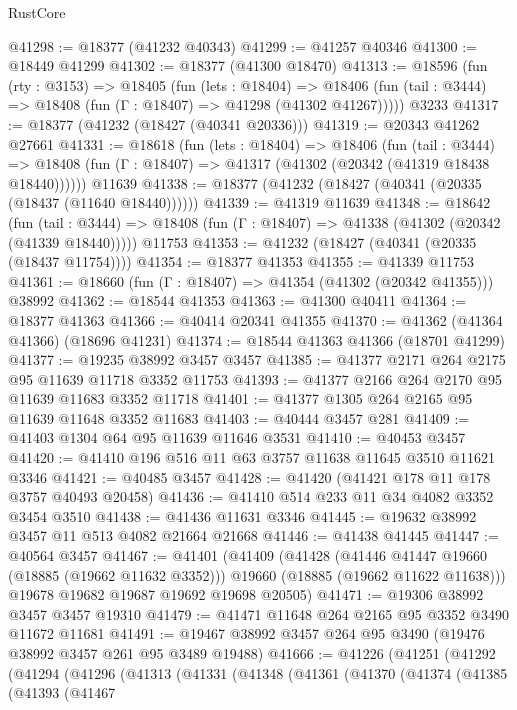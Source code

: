 \begin{lexlean}{RustCore}
\begin{coremodule}
@41298 := @18377 (@41232 @40343)
@41299 := @41257 @40346
@41300 := @18449 @41299
@41302 := @18377 (@41300 @18470)
@41313 := @18596
    (fun (rty : @3153) =>
    @18405
      (fun (lets : @18404) =>
      @18406 (fun (tail : @3444) => @18408 (fun (Γ : @18407) => @41298 (@41302 @41267)))))
    @3233
@41317 := @18377 (@41232 (@18427 (@40341 @20336)))
@41319 := @20343 @41262 @27661
@41331 := @18618
    (fun (lets : @18404) =>
    @18406
      (fun (tail : @3444) =>
      @18408 (fun (Γ : @18407) => @41317 (@41302 (@20342 (@41319 @18438 @18440))))))
    @11639
@41338 := @18377 (@41232 (@18427 (@40341 (@20335 (@18437 (@11640 @18440))))))
@41339 := @41319 @11639
@41348 := @18642
    (fun (tail : @3444) => @18408 (fun (Γ : @18407) => @41338 (@41302 (@20342 (@41339 @18440)))))
    @11753
@41353 := @41232 (@18427 (@40341 (@20335 (@18437 @11754))))
@41354 := @18377 @41353
@41355 := @41339 @11753
@41361 := @18660 (fun (Γ : @18407) => @41354 (@41302 (@20342 @41355))) @38992
@41362 := @18544 @41353
@41363 := @41300 @40411
@41364 := @18377 @41363
@41366 := @40414 @20341 @41355
@41370 := @41362 (@41364 @41366) (@18696 @41231)
@41374 := @18544 @41363 @41366 (@18701 @41299)
@41377 := @19235 @38992 @3457 @3457
@41385 := @41377 @2171 @264 @2175 @95 @11639 @11718 @3352 @11753
@41393 := @41377 @2166 @264 @2170 @95 @11639 @11683 @3352 @11718
@41401 := @41377 @1305 @264 @2165 @95 @11639 @11648 @3352 @11683
@41403 := @40444 @3457 @281
@41409 := @41403 @1304 @64 @95 @11639 @11646 @3531
@41410 := @40453 @3457
@41420 := @41410 @196 @516 @11 @63 @3757 @11638 @11645 @3510 @11621 @3346
@41421 := @40485 @3457
@41428 := @41420 (@41421 @178 @11 @178 @3757 @40493 @20458)
@41436 := @41410 @514 @233 @11 @34 @4082 @3352 @3454 @3510
@41438 := @41436 @11631 @3346
@41445 := @19632 @38992 @3457 @11 @513 @4082 @21664 @21668
@41446 := @41438 @41445
@41447 := @40564 @3457
@41467 := @41401
    (@41409
      (@41428
        (@41446 @41447 @19660 (@18885 (@19662 @11632 @3352)))
        @19660
        (@18885 (@19662 @11622 @11638)))
      @19678
      @19682
      @19687
      @19692
      @19698
      @20505)
@41471 := @19306 @38992 @3457 @3457 @19310
@41479 := @41471 @11648 @264 @2165 @95 @3352 @3490 @11672 @11681
@41491 := @19467 @38992 @3457 @264 @95 @3490 (@19476 @38992 @3457 @261 @95 @3489 @19488)
@41666 := @41226
    (@41251
      (@41292
        (@41294
          (@41296
            (@41313
              (@41331
                (@41348
                  (@41361
                    (@41370
                      (@41374
                        (@41385
                          (@41393
                            (@41467

\end{coremodule}
\end{lexlean}
